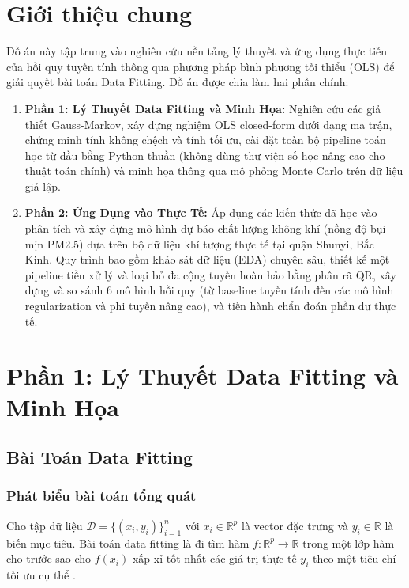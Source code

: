 \documentclass[12pt,a4paper]{article}
\begin{document}
\newpage
{}
\tableofcontents
\newpage


\section{Giới thiệu chung}
Đồ án này tập trung vào nghiên cứu nền tảng lý thuyết và ứng dụng thực tiễn của hồi quy tuyến tính thông qua phương pháp bình phương tối thiểu (OLS) để giải quyết bài toán Data Fitting. Đồ án được chia làm hai phần chính:
\begin{enumerate}
    \item \textbf{Phần 1: Lý Thuyết Data Fitting và Minh Họa:} Nghiên cứu các giả thiết Gauss-Markov, xây dựng nghiệm OLS closed-form dưới dạng ma trận, chứng minh tính không chệch và tính tối ưu, cài đặt toàn bộ pipeline toán học từ đầu bằng Python thuần (không dùng thư viện số học nâng cao cho thuật toán chính) và minh họa thông qua mô phỏng Monte Carlo trên dữ liệu giả lập.
    \item \textbf{Phần 2: Ứng Dụng vào Thực Tế:} Áp dụng các kiến thức đã học vào phân tích và xây dựng mô hình dự báo chất lượng không khí (nồng độ bụi mịn PM2.5) dựa trên bộ dữ liệu khí tượng thực tế tại quận Shunyi, Bắc Kinh. Quy trình bao gồm khảo sát dữ liệu (EDA) chuyên sâu, thiết kế một pipeline tiền xử lý và loại bỏ đa cộng tuyến hoàn hảo bằng phân rã QR, xây dựng và so sánh 6 mô hình hồi quy (từ baseline tuyến tính đến các mô hình regularization và phi tuyến nâng cao), và tiến hành chẩn đoán phần dư thực tế.
\end{enumerate}

\clearpage

\section{Phần 1: Lý Thuyết Data Fitting và Minh Họa}

\subsection{Bài Toán Data Fitting}

\subsubsection{Phát biểu bài toán tổng quát}
Cho tập dữ liệu $\mathcal{D} = \{(x_i, y_i)\}_{i=1}^n$ với $x_i \in \mathbb{R}^p$ là vector đặc trưng và $y_i \in \mathbb{R}$ là biến mục tiêu. Bài toán data fitting là đi tìm hàm $f: \mathbb{R}^p \to \mathbb{R}$ trong một lớp hàm cho trước sao cho $f(x_i)$ xấp xỉ tốt nhất các giá trị thực tế $y_i$ theo một tiêu chí tối ưu cụ thể \cite{james}.
\end{document}
